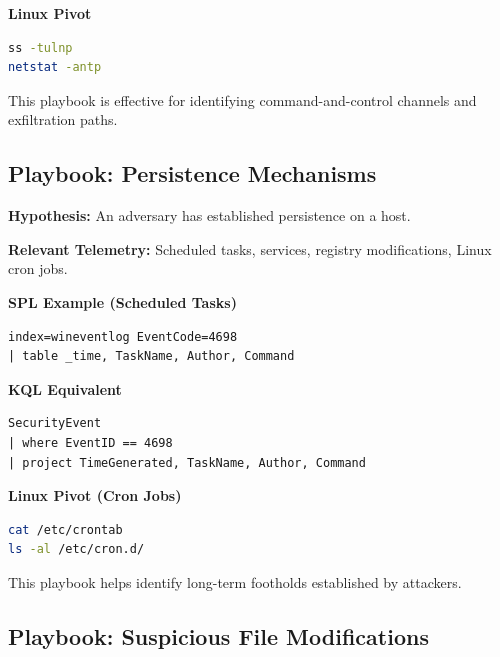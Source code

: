 \textbf{Linux Pivot}

\begin{lstlisting}[language=bash]
ss -tulnp
netstat -antp
\end{lstlisting}

This playbook is effective for identifying command-and-control channels and exfiltration paths.


\subsection*{Playbook: Persistence Mechanisms}

\textbf{Hypothesis:}  
An adversary has established persistence on a host.

\textbf{Relevant Telemetry:}  
Scheduled tasks, services, registry modifications, Linux cron jobs.

\textbf{SPL Example (Scheduled Tasks)}

\begin{lstlisting}
index=wineventlog EventCode=4698
| table _time, TaskName, Author, Command
\end{lstlisting}

\textbf{KQL Equivalent}

\begin{lstlisting}
SecurityEvent
| where EventID == 4698
| project TimeGenerated, TaskName, Author, Command
\end{lstlisting}

\textbf{Linux Pivot (Cron Jobs)}

\begin{lstlisting}[language=bash]
cat /etc/crontab
ls -al /etc/cron.d/
\end{lstlisting}

This playbook helps identify long-term footholds established by attackers.


\subsection*{Playbook: Suspicious File Modifications}

